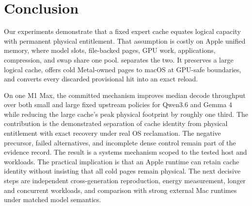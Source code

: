 \section{Conclusion}
\label{sec:conclusion}

Our experiments demonstrate that a fixed expert cache equates logical capacity
with permanent physical entitlement. That assumption is costly on Apple unified memory, where model
slots, file-backed pages, GPU work, applications, compression, and swap share
one pool. \system separates the two. It preserves a large logical cache, offers
cold Metal-owned pages to macOS at GPU-safe boundaries, and converts every
discarded provisional hit into an exact reload.

On one M1 Max, the committed mechanism improves median decode throughput over
both small and large fixed upstream policies for Qwen3.6 and Gemma 4 while
reducing the large cache's peak physical footprint by roughly one third. The
contribution is the demonstrated separation of cache identity from physical
entitlement with exact recovery under real OS reclamation. The
negative precursor, failed alternatives, and incomplete dense control remain
part of the evidence record. The result is a systems mechanism scoped to the
tested host and workloads. The practical implication is that an Apple runtime
can retain cache identity without insisting that all cold pages remain physical.
The next decisive steps are independent
cross-generation reproduction, energy measurement, longer and concurrent
workloads, and comparison with strong external Mac runtimes under matched model
semantics.

